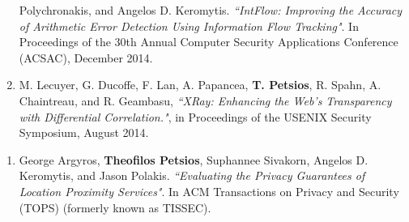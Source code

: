 \begin{cvparagraph}
\begin{enumerate}[label=C\arabic*]
        Polychronakis, and Angelos D. Keromytis. \textit{``IntFlow: Improving
        the Accuracy of Arithmetic Error Detection Using Information Flow
        Tracking"}. In Proceedings of the 30th Annual Computer Security
        Applications Conference (ACSAC), December 2014.\label{itm:intflow}
    \item M. Lecuyer, G. Ducoffe, F. Lan, A. Papancea, \textbf{T. Petsios}, R.
        Spahn, A. Chaintreau, and R. Geambasu, \textit{``XRay: Enhancing the
        Web's Transparency with Differential Correlation."}, in Proceedings of
        the USENIX Security Symposium, August 2014.\label{itm:xray}
\end{enumerate}
\end{cvparagraph}

\begin{cvparagraph}
\begin{enumerate}[label=J\arabic*]
    \item George Argyros, \textbf{Theofilos Petsios}, Suphannee Sivakorn,
        Angelos D. Keromytis, and Jason Polakis. \textit{``Evaluating the
        Privacy Guarantees of Location Proximity Services"}. In ACM
        Transactions on Privacy and Security (TOPS) (formerly known as
        TISSEC).\label{itm:istalker_tops}
\end{enumerate}
\end{cvparagraph}
